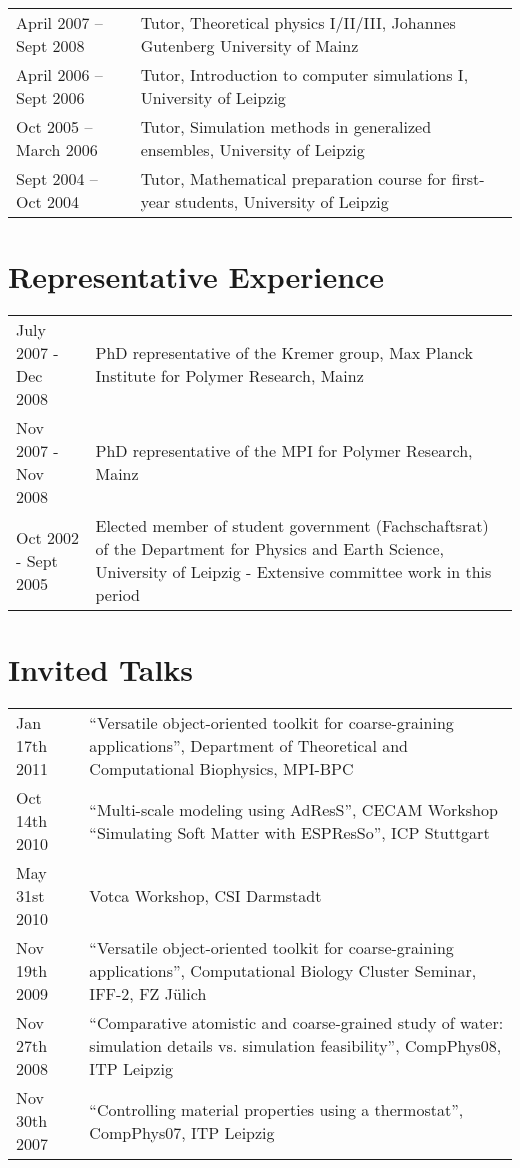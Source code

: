 \documentclass{article}
\begin{document}
\begin{tabular}{p{}p{}}
April 2007 -- Sept 2008 & Tutor, Theoretical physics I/II/III, Johannes Gutenberg University of Mainz \\
April 2006 -- Sept 2006 & Tutor, Introduction to computer simulations I, University of Leipzig \\
Oct 2005 -- March 2006 & Tutor, Simulation methods in generalized ensembles, University of Leipzig \\
Sept 2004 -- Oct 2004 & Tutor, Mathematical preparation course for first-year students, University of Leipzig \\
\end{tabular}

\section*{Representative Experience}

\begin{tabular}{p{}p{}}
July 2007 - Dec 2008 & PhD representative of the Kremer group, Max Planck Institute for Polymer Research, Mainz \\
Nov 2007 - Nov 2008 & PhD representative of the MPI for Polymer Research, Mainz \\
Oct 2002 - Sept 2005 & Elected member of student government (Fachschaftsrat) of the Department for Physics and Earth Science, University of Leipzig - Extensive committee work in this period\\
\end{tabular}

\section*{Invited Talks}

\begin{tabular}{p{}p{}}
Jan 17th 2011 & ``Versatile object-oriented toolkit for coarse-graining applications'', Department of Theoretical and Computational Biophysics, MPI-BPC\\
Oct 14th 2010 & ``Multi-scale modeling using AdResS'', CECAM Workshop ``Simulating Soft Matter with ESPResSo'', ICP Stuttgart\\
May 31st 2010 & Votca Workshop, CSI Darmstadt \\
Nov 19th 2009 & ``Versatile object-oriented toolkit for coarse-graining applications'', Computational Biology Cluster Seminar, IFF-2, FZ J{\"u}lich\\
Nov 27th 2008 & ``Comparative atomistic and coarse-grained study of water: simulation details vs. simulation feasibility'', CompPhys08, ITP Leipzig\\
Nov 30th 2007 & ``Controlling material properties using a thermostat'', CompPhys07, ITP Leipzig\\
\end{tabular}
\end{document}
